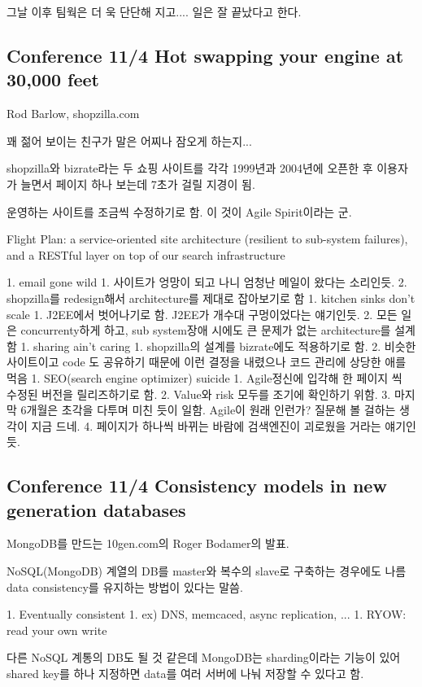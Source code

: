 \documentclass[a4paper]{article}
\begin{document}
그날 이후 팀웍은 더 욱 단단해 지고.... 일은 잘 끝났다고 한다.
 
\subsection{Conference 11/4 Hot swapping your engine at 30,000 feet}
 
Rod Barlow, shopzilla.com
 
꽤 젊어 보이는 친구가 말은 어찌나 잠오게 하는지...
 
shopzilla와 bizrate라는 두 쇼핑 사이트를 각각 1999년과 2004년에 오픈한
후 이용자가 늘면서 페이지 하나 보는데 7초가 걸릴 지경이 됨.
 
운영하는 사이트를 조금씩 수정하기로 함. 이 것이 Agile Spirit이라는 군.
 
Flight Plan: a service-oriented site architecture (resilient to
sub-system failures), and a RESTful layer on top of our search
infrastructure
 
1. email gone wild
1. 사이트가 엉망이 되고 나니 엄청난 메일이 왔다는 소리인듯. 
2. shopzilla를 redesign해서 architecture를 제대로 잡아보기로 함
1. kitchen sinks don’t scale
1. J2EE에서 벗어나기로 함. J2EE가 개수대 구멍이었다는 얘기인듯.
2. 모든 일은 concurrenty하게 하고, sub system장애 시에도 큰 문제가 없는 architecture를 설계함
1. sharing ain’t caring
1. shopzilla의 설계를 bizrate에도 적용하기로 함.
2. 비슷한 사이트이고 code 도 공유하기 때문에 이런 결정을 내렸으나 코드 관리에 상당한 애를 먹음
1. SEO(search engine optimizer) suicide
1. Agile정신에 입각해 한 페이지 씩 수정된 버전을 릴리즈하기로 함.
2. Value와 risk 모두를 조기에 확인하기 위함.
3. 마지막 6개월은 초각을 다투며 미친 듯이 일함. Agile이 원래 인런가? 질문해 볼 걸하는 생각이 지금 드네.
4. 페이지가 하나씩 바뀌는 바람에  검색엔진이 괴로웠을 거라는 얘기인듯.
 
\subsection{Conference 11/4 Consistency models in new generation databases}
 
MongoDB를 만드는 10gen.com의 Roger Bodamer의 발표.
 
NoSQL(MongoDB) 계열의 DB를 master와 복수의 slave로 구축하는 경우에도
나름 data consistency를 유지하는 방법이 있다는 말씀.
 
1. Eventually consistent
1. ex) DNS, memcaced, async replication, ...
1. RYOW: read your own write
 
다른 NoSQL 계통의 DB도 될 것 같은데 MongoDB는 sharding이라는 기능이
있어 shared key를 하나 지정하면 data를 여러 서버에 나눠 저장할 수
있다고 함.
 
\end{document}
